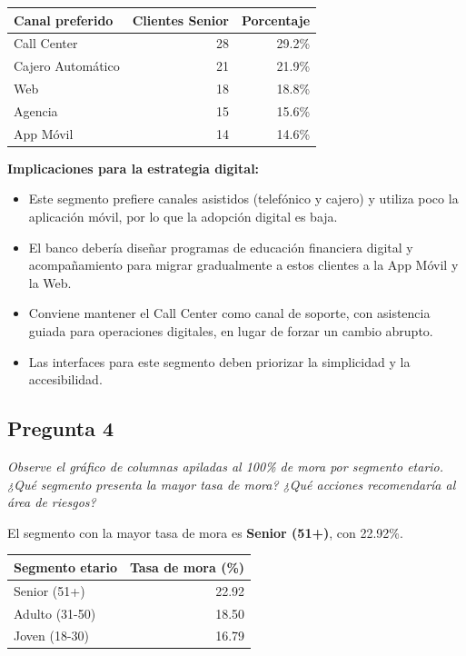 \documentclass[11pt,a4paper]{article}
\newcommand{\pregunta}[2]{\subsection*{Pregunta #1}\textit{#2}}
\begin{document}
\begin{center}
\begin{tabular}{@{}lrr@{}}
\toprule
Canal preferido & Clientes Senior & Porcentaje \\
\midrule
Call Center & 28 & 29.2\% \\
Cajero Automático & 21 & 21.9\% \\
Web & 18 & 18.8\% \\
Agencia & 15 & 15.6\% \\
App Móvil & 14 & 14.6\% \\
\bottomrule
\end{tabular}
\end{center}

\textbf{Implicaciones para la estrategia digital:}
\begin{itemize}[nosep]
  \item Este segmento prefiere canales asistidos (telefónico y cajero) y utiliza poco la aplicación móvil, por lo que la adopción digital es baja.
  \item El banco debería diseñar programas de educación financiera digital y acompañamiento para migrar gradualmente a estos clientes a la App Móvil y la Web.
  \item Conviene mantener el Call Center como canal de soporte, con asistencia guiada para operaciones digitales, en lugar de forzar un cambio abrupto.
  \item Las interfaces para este segmento deben priorizar la simplicidad y la accesibilidad.
\end{itemize}

\pregunta{4}{Observe el gráfico de columnas apiladas al 100\% de mora por segmento etario. ¿Qué segmento presenta la mayor tasa de mora? ¿Qué acciones recomendaría al área de riesgos?}

El segmento con la mayor tasa de mora es \textbf{Senior (51+)}, con 22.92\%.

\begin{center}
\begin{tabular}{@{}lr@{}}
\toprule
Segmento etario & Tasa de mora (\%) \\
\midrule
Senior (51+) & 22.92 \\
Adulto (31-50) & 18.50 \\
Joven (18-30) & 16.79 \\
\bottomrule
\end{tabular}
\end{center}
\end{document}
